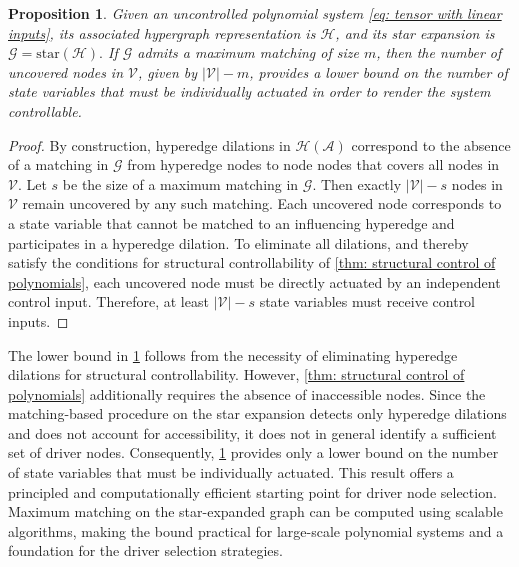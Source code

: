 \documentclass[journal,twoside,web]{ieeecolor}
\newtheorem{proposition}{Proposition}
\newcommand{\At}{\mathscr{A}}
\newcommand{\Gs}{\mathcal{G}}
\newcommand{\Hs}{\mathcal{H}}
\newcommand{\Vs}{\mathcal{V}}
\begin{document}
\begin{proposition}\label{thm: lower bound}
Given an uncontrolled polynomial system \eqref{eq: tensor with linear inputs}, its associated hypergraph representation is $\Hs$, and its star expansion is $\Gs=\text{star}(\Hs).$ If $\Gs$ admits a maximum matching of size $m$, then the number of uncovered nodes in $\Vs$, given by $|\Vs| - m$, provides a lower bound on the number of state variables that must be individually actuated in order to render the system controllable.
\end{proposition}
\begin{proof}
By construction, hyperedge dilations in $\Hs(\At)$ correspond to the absence of a matching in $\Gs$ from hyperedge nodes to node nodes that covers all nodes in $\Vs$.
%
Let $s$ be the size of a maximum matching in $\Gs$. Then exactly $|\Vs| - s$ nodes in $\Vs$ remain uncovered by any such matching. Each uncovered node corresponds to a state variable that cannot be matched to an influencing hyperedge and participates in a hyperedge dilation.
%
To eliminate all dilations, and thereby satisfy the conditions for structural controllability of \cref{thm: structural control of polynomials}, each uncovered node must be directly actuated by an independent control input. Therefore, at least $|\Vs| - s$ state variables must receive control inputs.
\end{proof}

The lower bound in \cref{thm: lower bound} follows from the necessity of eliminating hyperedge dilations for structural controllability. However, \cref{thm: structural control of polynomials} additionally requires the absence of inaccessible nodes. Since the matching-based procedure on the star expansion detects only hyperedge dilations and does not account for accessibility, it does not in general identify a sufficient set of driver nodes. Consequently, \cref{thm: lower bound} provides only a lower bound on the number of state variables that must be individually actuated.
%
This result offers a principled and computationally efficient starting point for driver node selection. Maximum matching on the star-expanded graph can be computed using scalable algorithms, making the bound practical for large-scale polynomial systems and a foundation for the driver selection strategies.
\end{document}
